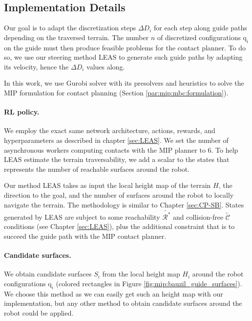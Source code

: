 
\subsection{Implementation Details}
\label{subsub:mip:implementation_details}
Our goal is to adapt the discretization steps $\Delta D_i$ for each step along guide paths depending on the traversed terrain.
The number $n$ of discretized configurations $\mbox{q}_i$ on the guide must then produce feasible problems for the contact planner.
To do so, we use our steering method LEAS to generate such guide paths by adapting its velocity, hence the $\Delta D_i$ values along.

In this work, we use Gurobi solver \cite{gurobi} with its presolvers and heuristics to solve the MIP formulation for contact planning (Section \ref{par:mip:mbc:formulation}).

\paragraph{RL policy.}
We employ the exact same network architecture, actions, rewards, and hyperparameters as described in chapter \ref{sec:LEAS}. We set the number of asynchronous workers computing contacts with the MIP planner to 6.
To help LEAS estimate the terrain traversability, we add a scalar to the states that represents the number of reachable surfaces around the robot.

Our method LEAS takes as input the local height map of the terrain $H$, the direction to the goal, and the number of surfaces around the robot to locally navigate the terrain. 
The methodology is similar to Chapter \ref{sec:CP-SB}.
States generated by LEAS are subject to some reachability $\tilde{\mathcal{R}^*}$ and collision-free $\tilde{\mathcal{C}}$ conditions (see Chapter \ref{sec:LEAS}), plus the additional constraint that is to succeed the guide path with the MIP contact planner.


\paragraph{Candidate surfaces.}
We obtain candidate surfaces $S_i$ from the local height map $H_i$ around the robot configurations $\mbox{q}_i$ (colored rectangles in Figure \ref{fig:mip:bauzil_guide_surfaces}).
We choose this method as we can easily get such an height map with our implementation, but any other method to obtain candidate surfaces around the robot could be applied.

